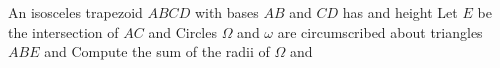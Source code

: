 An isosceles trapezoid $ABCD$ with bases $AB$ and $CD$ has   and height   Let $E$ be the intersection of $AC$ and   Circles $\Omega$ and $\omega$ are circumscribed about triangles $ABE$ and   Compute the sum of the radii of $\Omega$ and 